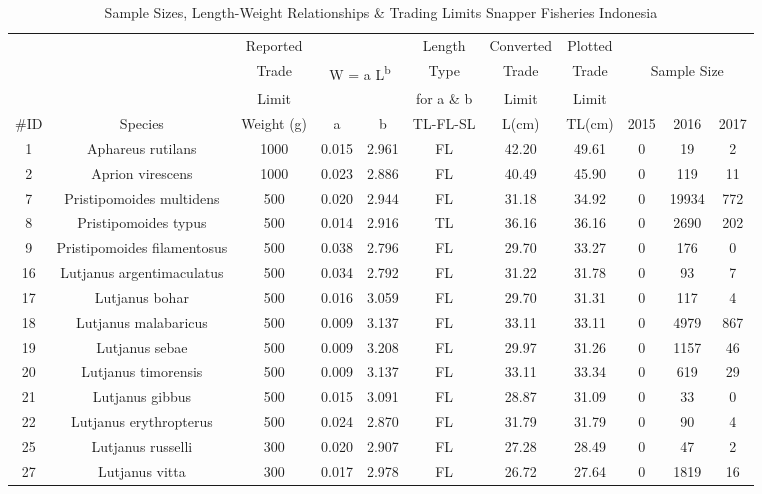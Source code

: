 \documentclass{report}\usepackage[]{graphicx}\usepackage[]{color}
\begin{document}
\begin{table}[ht]
\centering
\caption{Sample Sizes, Length-Weight Relationships \& Trading Limits Snapper Fisheries Indonesia} 
{\small
\begin{tabular}{ccccccccccc}
  \hline
 &  & Reported &  &  & Length & Converted & Plotted &  &  &  \\ 
  { } & { } & {Trade} & \multicolumn{2}{c}{ W = a L\textsuperscript{b}} & {Type} & {Trade} & {Trade} & \multicolumn{3}{c}{Sample Size}\\
      { } & { } & {Limit} & { } & { } & {for a \& b} & {Limit} & {Limit} & { } & { } & { }\\
      {\#ID} & {Species} & {Weight (g)} & {a} & {b} & {TL-FL-SL} & {L(cm)} & {TL(cm)} & {2015} & {2016} & {2017}\\ \hline
1 & Aphareus rutilans & 1000 & 0.015 & 2.961 & FL & 42.20 & 49.61 & 0 & 19 & 2 \\ 
  2 & Aprion virescens & 1000 & 0.023 & 2.886 & FL & 40.49 & 45.90 & 0 & 119 & 11 \\ 
  7 & Pristipomoides multidens & 500 & 0.020 & 2.944 & FL & 31.18 & 34.92 & 0 & 19934 & 772 \\ 
  8 & Pristipomoides typus & 500 & 0.014 & 2.916 & TL & 36.16 & 36.16 & 0 & 2690 & 202 \\ 
  9 & Pristipomoides filamentosus & 500 & 0.038 & 2.796 & FL & 29.70 & 33.27 & 0 & 176 & 0 \\ 
  16 & Lutjanus argentimaculatus & 500 & 0.034 & 2.792 & FL & 31.22 & 31.78 & 0 & 93 & 7 \\ 
  17 & Lutjanus bohar & 500 & 0.016 & 3.059 & FL & 29.70 & 31.31 & 0 & 117 & 4 \\ 
  18 & Lutjanus malabaricus & 500 & 0.009 & 3.137 & FL & 33.11 & 33.11 & 0 & 4979 & 867 \\ 
  19 & Lutjanus sebae & 500 & 0.009 & 3.208 & FL & 29.97 & 31.26 & 0 & 1157 & 46 \\ 
  20 & Lutjanus timorensis & 500 & 0.009 & 3.137 & FL & 33.11 & 33.34 & 0 & 619 & 29 \\ 
  21 & Lutjanus gibbus & 500 & 0.015 & 3.091 & FL & 28.87 & 31.09 & 0 & 33 & 0 \\ 
  22 & Lutjanus erythropterus & 500 & 0.024 & 2.870 & FL & 31.79 & 31.79 & 0 & 90 & 4 \\ 
  25 & Lutjanus russelli & 300 & 0.020 & 2.907 & FL & 27.28 & 28.49 & 0 & 47 & 2 \\ 
  27 & Lutjanus vitta & 300 & 0.017 & 2.978 & FL & 26.72 & 27.64 & 0 & 1819 & 16 \\ 

\end{tabular}}
\end{table}
\end{document}
